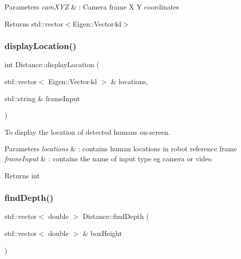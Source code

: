 \begin{DoxyParams}{Parameters}
{\em cam\+X\+YZ} & \+: Camera frame X Y coordinates \\
\hline
\end{DoxyParams}
\begin{DoxyReturn}{Returns}
std\+::vector$<$\+Eigen\+::\+Vector4d$>$ 
\end{DoxyReturn}
\mbox{\label{classDistance_a08964f47af73ec94f0ce46c29ceec36f}} 
\subsubsection{\texorpdfstring{display\+Location()}{displayLocation()}}
{\footnotesize\ttfamily int Distance\+::display\+Location (\begin{DoxyParamCaption}\item[{std\+::vector$<$ Eigen\+::\+Vector4d $>$ \&}]{locations,  }\item[{std\+::string \&}]{frame\+Input }\end{DoxyParamCaption})}



To display the location of detected humans on-\/screen. 


\begin{DoxyParams}{Parameters}
{\em locations} & \+: contains human locations in robot reference frame \\
\hline
{\em frame\+Input} & \+: contains the name of input type eg camera or video \\
\hline
\end{DoxyParams}
\begin{DoxyReturn}{Returns}
int 
\end{DoxyReturn}
\mbox{\label{classDistance_a9371ccc57f5038e09c65f15f7094b5b5}} 
\subsubsection{\texorpdfstring{find\+Depth()}{findDepth()}}
{\footnotesize\ttfamily std\+::vector$<$ double $>$ Distance\+::find\+Depth (\begin{DoxyParamCaption}\item[{std\+::vector$<$ double $>$ \&}]{box\+Height }\end{DoxyParamCaption})}



